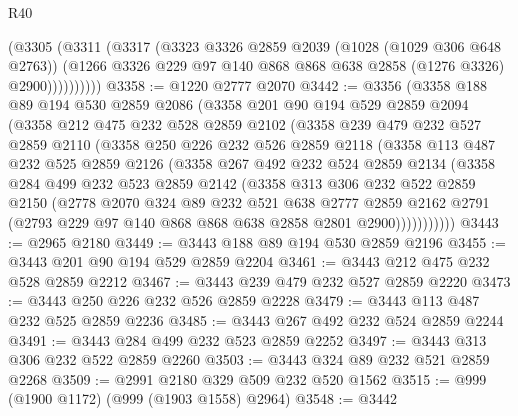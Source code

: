 \begin{lexlean}{R40}
\begin{coremodule}
              (@3305
                (@3311
                  (@3317
                    (@3323
                      @3326
                      @2859
                      @2039
                      (@1028 (@1029 @306 @648 @2763))
                      (@1266 @3326 @229 @97 @140 @868 @868 @638 @2858 (@1276 @3326) @2900))))))))))
@3358 := @1220 @2777 @2070
@3442 := @3356
    (@3358
      @188
      @89
      @194
      @530
      @2859
      @2086
      (@3358
        @201
        @90
        @194
        @529
        @2859
        @2094
        (@3358
          @212
          @475
          @232
          @528
          @2859
          @2102
          (@3358
            @239
            @479
            @232
            @527
            @2859
            @2110
            (@3358
              @250
              @226
              @232
              @526
              @2859
              @2118
              (@3358
                @113
                @487
                @232
                @525
                @2859
                @2126
                (@3358
                  @267
                  @492
                  @232
                  @524
                  @2859
                  @2134
                  (@3358
                    @284
                    @499
                    @232
                    @523
                    @2859
                    @2142
                    (@3358
                      @313
                      @306
                      @232
                      @522
                      @2859
                      @2150
                      (@2778
                        @2070
                        @324
                        @89
                        @232
                        @521
                        @638
                        @2777
                        @2859
                        @2162
                        @2791
                        (@2793 @229 @97 @140 @868 @868 @638 @2858 @2801 @2900)))))))))))
@3443 := @2965 @2180
@3449 := @3443 @188 @89 @194 @530 @2859 @2196
@3455 := @3443 @201 @90 @194 @529 @2859 @2204
@3461 := @3443 @212 @475 @232 @528 @2859 @2212
@3467 := @3443 @239 @479 @232 @527 @2859 @2220
@3473 := @3443 @250 @226 @232 @526 @2859 @2228
@3479 := @3443 @113 @487 @232 @525 @2859 @2236
@3485 := @3443 @267 @492 @232 @524 @2859 @2244
@3491 := @3443 @284 @499 @232 @523 @2859 @2252
@3497 := @3443 @313 @306 @232 @522 @2859 @2260
@3503 := @3443 @324 @89 @232 @521 @2859 @2268
@3509 := @2991 @2180 @329 @509 @232 @520 @1562
@3515 := @999 (@1900 @1172) (@999 (@1903 @1558) @2964)
@3548 := @3442

\end{coremodule}
\end{lexlean}
